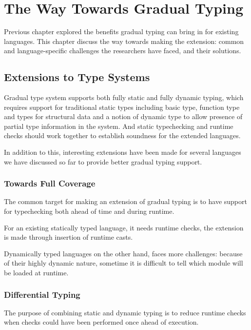 
\renewcommand{\thechapter}{3}

\chapter{The Way Towards Gradual Typing}

Previous chapter explored the benefits gradual typing
can bring in for existing languages.
This chapter discuss the way towards making the extension:
common and language-specific challenges the researchers have faced,
and their solutions.

\section{Extensions to Type Systems}

Gradual type system supports both fully static and fully dynamic typing,
which requires support for traditional static types including
basic type, function type and types for structural data
and a notion of dynamic type to allow presence of partial type information
in the system. And static typechecking and runtime checks should work together
to establish soundness for the extended languages.

In addition to this, interesting extensions have been made
for several languages we have discussed so far to provide better gradual
typing support.

\subsection{Towards Full Coverage}

The common target for making an extension of gradual typing is to
have support for typechecking both ahead of time and during runtime.

For an existing statically typed language, it needs runtime checks,
the extension is made through insertion of runtime casts.

Dynamically typed languages on the other hand, faces more challenges:
because of their highly dynamic nature, sometime it is difficult
to tell which module will be loaded at runtime.

\subsection{Differential Typing}

The purpose of combining static and dynamic typing is to reduce
runtime checks when checks could have been performed once ahead of execution.

